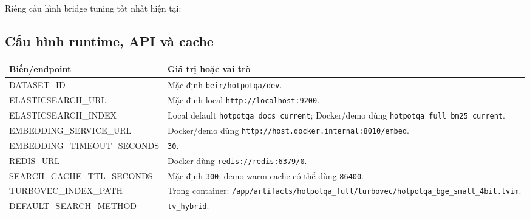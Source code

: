 \documentclass[11pt,a4paper]{article}
\begin{document}
Riêng cấu hình bridge tuning tốt nhất hiện tại:

\begin{center}
\end{center}

\subsection{Cấu hình runtime, API và cache}

\small
\begin{tabularx}{\textwidth}{>{\ttfamily\raggedright\arraybackslash}p{} Y}
\toprule
Biến/endpoint & Giá trị hoặc vai trò \\
\midrule
DATASET\_ID & Mặc định \texttt{beir/hotpotqa/dev}. \\
ELASTICSEARCH\_URL & Mặc định local \texttt{http://localhost:9200}. \\
ELASTICSEARCH\_INDEX & Local default \texttt{hotpotqa\_docs\_current}; Docker/demo dùng \texttt{hotpotqa\_full\_bm25\_current}. \\
EMBEDDING\_SERVICE\_URL & Docker/demo dùng \texttt{http://host.docker.internal:8010/embed}. \\
EMBEDDING\_TIMEOUT\_SECONDS & \texttt{30}. \\
REDIS\_URL & Docker dùng \texttt{redis://redis:6379/0}. \\
SEARCH\_CACHE\_TTL\_SECONDS & Mặc định \texttt{300}; demo warm cache có thể dùng \texttt{86400}. \\
TURBOVEC\_INDEX\_PATH & Trong container: \texttt{/app/artifacts/hotpotqa\_full/turbovec/}\newline \texttt{hotpotqa\_bge\_small\_4bit.tvim}. \\
DEFAULT\_SEARCH\_METHOD & \texttt{tv\_hybrid}. \\
\bottomrule
\end{tabularx}
\normalsize
\end{document}
